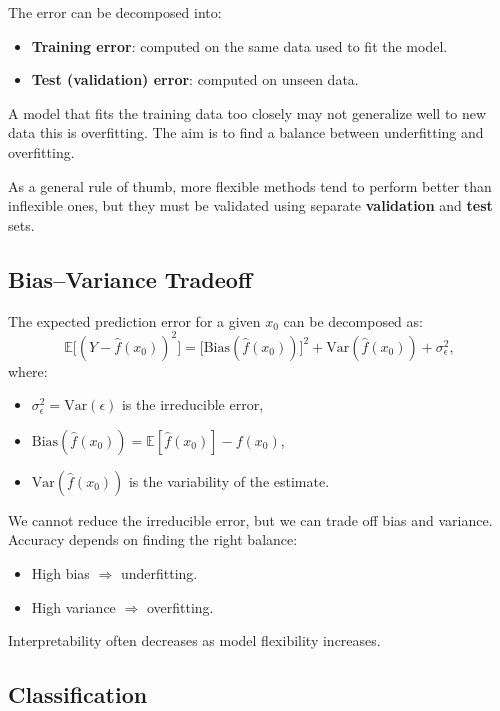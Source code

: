 The error can be decomposed into:
\begin{itemize}
    \item \textbf{Training error}: computed on the same data used to fit the model.
    \item \textbf{Test (validation) error}: computed on unseen data.
\end{itemize}

A model that fits the training data too closely may not generalize well to new data this is overfitting.  
The aim is to find a balance between underfitting and overfitting.

As a general rule of thumb, more flexible methods tend to perform better than inflexible ones, but they must be validated using separate \textbf{validation} and \textbf{test} sets.

\subsection{Bias--Variance Tradeoff}

The expected prediction error for a given \( x_0 \) can be decomposed as:
\[
\mathbb{E}\big[(Y - \hat{f}(x_0))^2\big] = 
\big[\text{Bias}(\hat{f}(x_0))\big]^2 + \text{Var}(\hat{f}(x_0)) + \sigma_\epsilon^2,
\]
where:
\begin{itemize}
    \item \( \sigma_\epsilon^2 = \text{Var}(\epsilon) \) is the irreducible error,
    \item \( \text{Bias}(\hat{f}(x_0)) = \mathbb{E}[\hat{f}(x_0)] - f(x_0) \),
    \item \( \text{Var}(\hat{f}(x_0)) \) is the variability of the estimate.
\end{itemize}

We cannot reduce the irreducible error, but we can trade off bias and variance.  
Accuracy depends on finding the right balance:
\begin{itemize}
    \item High bias \(\Rightarrow\) underfitting.
    \item High variance \(\Rightarrow\) overfitting.
\end{itemize}

Interpretability often decreases as model flexibility increases.

\subsection{Classification}

